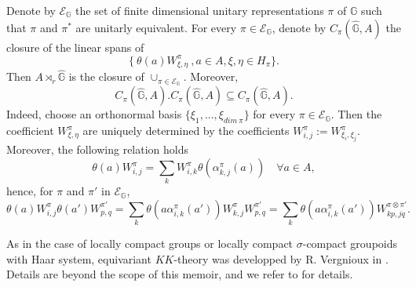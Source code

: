 \begin{rk} Denote by $\mathcal E_{\mathbb G}$ the set of finite dimensional unitary representations $\pi$ of $\mathbb G$ such that $\pi$ and $\pi^*$ are unitarly equivalent. For every $\pi\in \mathcal E_{\mathbb G}$, denote by $C_\pi(\hat{\mathbb G}, A)$ the closure of the linear spans of 
\[\{\ \theta(a) W_{\xi,\eta}^\pi \ ,a\in A, \xi,\eta\in H_\pi\}.\]
Then $A\rtimes_r \hat{\mathbb G}$ is the closure of $\cup_{\pi\in \mathcal E_{\mathbb G}}$. Moreover,
\[C_\pi(\hat{\mathbb G}, A).C_\pi(\hat{\mathbb G}, A) \subseteq C_\pi(\hat{\mathbb G}, A).\]
Indeed, choose an orthonormal basis $\{\xi_1,...,\xi_{dim\ \pi}\}$ for every $\pi\in\mathcal E_{\mathbb G}$. Then the coefficient $W_{\xi,\eta}^\pi$ are uniquely determined by the coefficients $W_{i,j}^\pi := W_{\xi_i,\xi_j}^\pi$. Moreover, the following relation holds
\[\theta(a)W_{i,j}^\pi = \sum_k W_{i,k}^\pi \theta(\alpha_{k,j}^\pi(a))\quad \forall a\in A,\]
hence, for $\pi$ and $\pi'$ in $\mathcal E_{\mathbb G}$,
\[\theta(a) W_{i,j}^\pi \theta(a')W_{p,q}^{\pi'} = \sum_k \theta(a \alpha_{i,k}^{\pi}(a')) W_{k,j}^\pi W_{p,q}^{\pi'} 
= \sum_k \theta(a \alpha_{i,k}^{\pi}(a')) W_{kp,jq}^{\pi\otimes \pi'}. \]
\end{rk}

As in the case of locally compact groups or locally compact $\sigma$-compact groupoids with Haar system, equivariant $KK$-theory was developped by R. Vergnioux in \cite{vergnioux}. Details are beyond the scope of this memoir, and we refer to \cite{vergnioux} for details.\\

